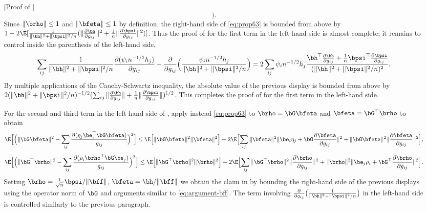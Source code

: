 \documentclass{colt2022} %
\renewenvironment{proof}[1][]
{
    \begin{newproof}
    \ifthenelse{\equal{#1}{}}{ }{\textbf{(#1) }}%
}{
    \end{newproof}
}
\numberwithin{equation}{section}
\begin{document}
\begin{proof} [Proof of ]
\begin{equation}
    \Bigr).
    \label{eq:argument-bff}
    \end{equation}
    Since $\|\brho\|\le 1$ and $\|\bfeta\|\le 1$ by definition,
    the right-hand side of \eqref{eq:prop63}
    is bounded from above by
    $1+2 \E[
    \frac{1}{\|\bh\|^2 + \|\bpsi\|^2/n}
    (
    \|\frac{\partial \bh}{\partial g_{ij}}\|^2
    +
    \frac 1 n \|\frac{\partial \bpsi}{\partial g_{ij}}\|^2
    )
    ]$.
    Thus the proof of  for the first term in the left-hand
    side is almost complete; it remains to control
    inside the parenthesis of the left-hand side,
    $$
    \sum_{ij}
    \frac{1}{\|\bh\|^2+\|\bpsi\|^2/n}\frac{\partial(\psi_i n^{-1/2} h_j)}{\partial g_{ij}}
    -
    \frac{\partial}{\partial g_{ij}}
    \Bigl(
\frac{
\psi_i n^{-1/2} h_j
}{\|\bh\|^2+\|\bpsi\|^2/n}
    \Bigr)
    =
    2
    \sum_{ij}
    \psi_i n^{-1/2}h_j
    \frac{  
    \bh^\top\frac{\partial\bh}{\partial g_{ij}}
    +
    \frac 1 n\bpsi^\top\frac{\partial\bpsi}{\partial g_{ij}}
    } {(\|\bh\|^2+\|\bpsi\|^2/n)^2}.
    $$
    By multiple applications of the Cauchy-Schwartz inequality, the absolute
    value of the previous display is bounded from above by
    $2(\|\bh\|^2+\|\bpsi\|^2/n)^{-1/2}
    (
    \sum_{ij}
    \|\frac{\partial\bh}{\partial g_{ij}}\|
    +\frac1n\|\frac{\partial\bpsi}{\partial g_{ij}}\|
    )^{1/2}
    $.
    This completes the proof of 
    for the first term in the left-hand side.

    For the second and third term in the left-hand side of ,
    apply instead \eqref{eq:prop63} to
    $\brho=\bG\bfeta$ and  $\bfeta = \bG^\top\brho$ to obtain
    \begin{equation*}
    \E\Bigl[\Bigl(\|\bG\bfeta\|^2 - \sum_{ij} \frac{\partial ( \eta_j\be_i^\top\bG\bfeta)}{g_{ij}}\Bigr)^2\Bigr]
    \le
    \E\Bigl[\|\bG\bfeta\|^2 \|\bfeta\|^2\Bigr]
    +
    2\E\Bigl[\sum_{ij}
    \|\bfeta\|^2
    \|
    \be_i\eta_j
    + \bG\frac{\partial \bfeta}{\partial g_{ij}}
    \|^2
    +
    \|\bG\bfeta\|^2 \| \frac{\partial \bfeta}{\partial g_{ij}}\|^2
    \Bigr],
    \end{equation*}
    \begin{equation*}
    \E\Bigl[\Bigl(\|\bG^\top\brho\|^2 - \sum_{ij} \frac{\partial ( \rho_i \brho^\top\bG\be_j)}{g_{ij}}\Bigr)^2\Bigr]
    \le
    \E\Bigl[\|\bG^\top\brho\|^2 \|\brho\|^2\Bigr]
    +
    2\E\Bigl[\sum_{ij}
    \|\bG^\top\brho\|^2
    \|
    \frac{\partial \brho}{\partial g_{ij}}
    \|^2
    +
    \|\brho\|^2 \|\be_j\rho_i+ \bG^\top\frac{\partial \brho}{\partial g_{ij}}\|^2
    \Bigr].
    \end{equation*}
    Setting $\brho = \frac{1}{\sqrt n} \bpsi / \|\bff\|$,
    $\bfeta = \bh /\|\bff\|$ we obtain
    the claim in  by bounding the right-hand side
    of the previous displays using the operator norm of $\bG$
    and arguments similar to \eqref{eq:argument-bff}.
    The term involving
    $\frac{\partial}{\partial g_{ij}}
\bigl( 
\frac{ 1 }{\|\bh\|^2+\|\bpsi\|^2/n}
\bigr)$ in the left-hand side is controlled similarly to
the previous paragraph.

\end{proof}
\end{document}
